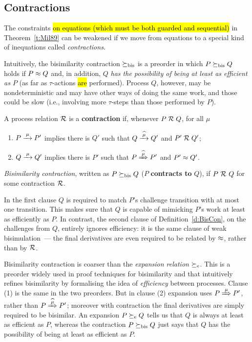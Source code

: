 \subsection{Contractions}
\label{s:mcontr}

The constraints \hl{on equations (which must be both guarded and
sequential)} in Theorem~\ref{t:Mil89} can be
weakened if we move from equations to a special kind of inequations called
  \emph{contractions}.

Intuitively, the bisimilarity contraction $\mathrel{\succeq_{\rm{bis}}}$ is a preorder in which 
$P \mathrel{\succeq_{\rm{bis}}} Q  $  holds  if $P \approx Q$ and, in addition, 
$Q$ \emph{has the possibility of being at least as efficient as $P$} (as far as
$\tau$-actions \hl{are} performed). 
Process $Q$, however, may be nondeterministic and may have other ways
of doing the same work, and those could be slow (i.e., involving
more $\tau$-steps than those performed by $P$).

\begin{definition}%
\label{d:BisCon}
A process relation ${{\cal R}}$ 
 is a \textbf{contraction} if, whenever
 $P\mathrel{\cal R} Q$, for all $\mu$
\begin{enumerate}
\item $P \arr\mu P'$ implies there is $Q'$ such that $Q \arcap \mu
  Q'$ and $P' \mathrel{\cal R} Q'$;
\item $Q \arr\mu Q'$   implies there is $P'$ such that $P \Arcap \mu
 P'$ and $P' \approx Q'$\enspace.
\end{enumerate}
\emph{Bisimilarity contraction}, written as $P \mathrel{\succeq_{\rm{bis}}} Q$ ($P$
\textbf{contracts to} $Q$), if $P\ {\cal R}\ Q$ for some contraction ${\cal R}$.
\end{definition}

In the first clause $Q$ is required to match $P$'s challenge
transition with at most one transition.
This makes sure that $Q$ is capable of mimicking $P$'s
work at least as efficiently as $P$. 
In contrast, the second clause of Definition~\ref{d:BisCon}, on the
challenges from $Q$, entirely ignores efficiency: it is the same
clause of  weak bisimulation~--- the final derivatives are even required
to be related  by $\approx$, rather than by ${\cal R}$.

Bisimilarity contraction is coarser than 
 the \emph{expansion relation} $\mathrel{\succeq_{\rm{e}}}$.
This is a preorder widely used in proof techniques for bisimilarity and that 
intuitively refines bisimilarity by 
 formalising the idea of \emph{efficiency} between processes.
Clause (1) is the same in the two
preorders. But in clause (2) expansion uses 
$P \Arr \mu P'$, rather than $P \Arcap \mu P'$; 
 moreover with
contraction the final derivatives are simply required to be bisimilar.
An expansion 
$P \mathrel{\succeq_{\rm{e}}} Q$
tells us  that $Q$ is always at least as efficient as $P$, whereas  the
 contraction $P \mathrel{\succeq_{\rm{bis}}} Q$  just says that $Q$ has the  possibility of
being at least as efficient as $P$. 

